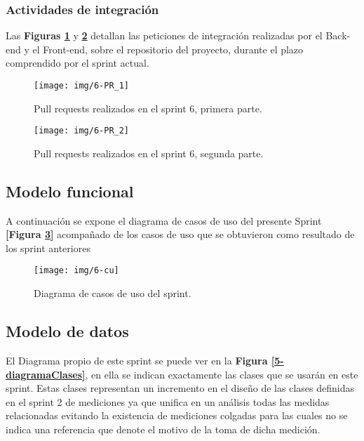 \subsubsection{Actividades de integración}

Las \textbf{Figuras \ref{6-PR_1}} y \textbf{\ref{6-PR_2}} detallan las peticiones de integración realizadas por el Back-end y el Front-end, sobre el repositorio del proyecto, durante el plazo comprendido por el sprint actual.

\begin{figure}[h!]
	\centering
	\texttt{[image: img/6-PR\_1]}
	\caption{Pull requests realizados en el sprint 6, primera parte.}
	\label{6-PR_1}
\end{figure}

\begin{figure}[h!]
	\centering
	\texttt{[image: img/6-PR\_2]}
	\caption{Pull requests realizados en el sprint 6, segunda parte.}
	\label{6-PR_2}
\end{figure}
\clearpage

\subsection{Modelo funcional} %
A continuación se expone el diagrama de casos de uso del presente Sprint \textbf{[Figura \ref{6-cu}]} acompañado de los casos de uso que se obtuvieron como resultado de los sprint anteriores



\begin{figure}[h]
	\centering
	\texttt{[image: img/6-cu]}
	\caption{Diagrama de casos de uso del sprint.}
	\label{6-cu}
\end{figure}

\clearpage

\subsection{Modelo de datos}
El Diagrama propio de este sprint se puede ver en la \textbf{Figura \ref{5-diagramaClases}}, en ella se indican exactamente las clases que se usarán en este sprint. Estas clases representan un incremento en el diseño de las clases definidas en el sprint 2 de mediciones ya que unifica en un análisis todas las medidas relacionadas evitando la existencia de mediciones colgadas para las cuales no se indica una referencia que denote el motivo de la toma de dicha medición.

